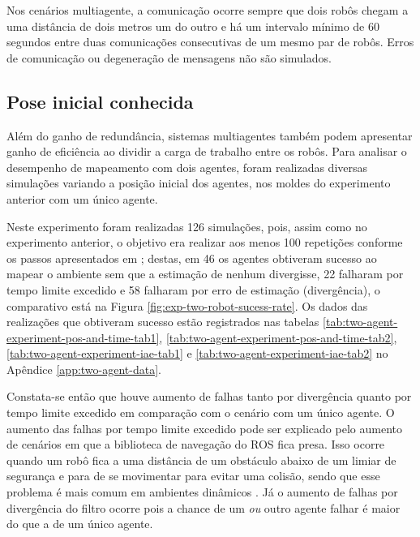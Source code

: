 Nos cenários multiagente, a comunicação ocorre sempre que dois robôs 
chegam a uma distância de dois metros um do outro e há um intervalo 
mínimo de 60 segundos entre duas comunicações consecutivas de um mesmo 
par de robôs. Erros de comunicação ou degeneração de mensagens não são 
simulados.

\subsection{Pose inicial conhecida}
\label{sec:exp-known-initial-pose}
Além do ganho de redundância, sistemas multiagentes também podem 
apresentar ganho de eficiência ao dividir a carga de trabalho entre os 
robôs. Para analisar o desempenho de mapeamento com dois agentes, 
foram realizadas diversas simulações variando a posição inicial dos 
agentes, nos moldes do experimento anterior com um único agente.

Neste experimento foram realizadas 126 simulações, pois, assim como no experimento anterior, o objetivo era realizar aos menos 100 repetições conforme os passos apresentados em \cite[p.~52]{paula2014metodo}; destas, em 46 os 
agentes obtiveram sucesso ao mapear o ambiente sem que a estimação de 
nenhum divergisse, 22 falharam por tempo limite excedido e 58 
falharam por erro de estimação (divergência), o comparativo está na 
Figura \ref{fig:exp-two-robot-sucess-rate}. Os dados das realizações 
que obtiveram sucesso estão registrados nas tabelas \ref{tab:two-agent-experiment-pos-and-time-tab1}, \ref{tab:two-agent-experiment-pos-and-time-tab2}, \ref{tab:two-agent-experiment-iae-tab1} e \ref{tab:two-agent-experiment-iae-tab2} no Apêndice \ref{app:two-agent-data}.

Constata-se então que houve aumento de falhas 
tanto por divergência quanto por tempo limite excedido em comparação 
com o cenário com um único agente. O aumento das falhas por tempo limite 
excedido pode ser explicado pelo aumento de cenários em que a biblioteca de navegação do 
ROS fica presa. Isso ocorre quando um robô fica a uma distância de um obstáculo abaixo de um limiar de segurança e para de se movimentar para evitar uma colisão, sendo que esse problema é mais comum em ambientes dinâmicos \cite{zheng2021ros}. Já o aumento de falhas por divergência do filtro ocorre 
pois a chance de um \emph{ou} outro agente falhar é maior do que a de um único agente.

